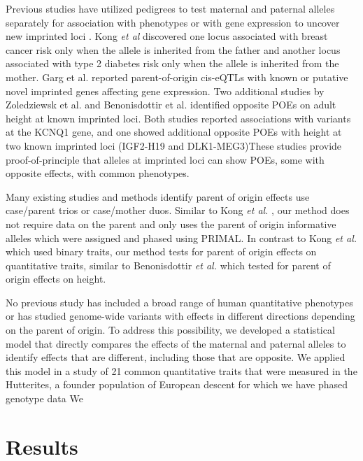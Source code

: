 Previous studies have utilized pedigrees to test maternal and paternal alleles separately for association with phenotypes or with gene expression to uncover new imprinted loci \citep{Kong:2009kk,Baran:2015cx,Garg2012a,Paper2014b,Benonisdottir:2016dz}. Kong \emph{et al} \citep{Kong:2009kk} discovered one locus associated with breast cancer risk only when the allele is inherited from the father and another locus associated with type 2 diabetes risk only when the allele is inherited from the mother. Garg et al. reported parent-of-origin cis-eQTLs with known or putative novel imprinted genes affecting gene expression\citep{Garg2012a}. Two additional studies by Zoledziewsk et al. and Benonisdottir et al. identified opposite POEs on adult height at known imprinted loci\citep{Zoledziewska:2015do,Benonisdottir:2016dz}. Both studies reported associations with variants at the KCNQ1 gene, and one showed additional opposite POEs with height at two known imprinted loci (IGF2-H19 and DLK1-MEG3)\citep{Benonisdottir:2016dz}These studies provide proof-of-principle that alleles at imprinted loci can show POEs, some with opposite effects, with common phenotypes. 

Many existing studies and methods identify parent of origin effects use case/parent trios or case/mother duos\citep{Chuang:2017kp,Howey:2012hj,Ainsworth:2010bp,Weinberg:1999km,Weinberg:1998cf}. Similar to Kong \emph{et al.} \citep{Kong:2009kk}, our method does not require data on the parent and only uses the parent of origin informative alleles which were assigned and phased using PRIMAL\citep{Livne2015}.  In contrast to Kong \emph{et al.} \citep{Kong:2009kk} which used binary traits, our method tests for parent of origin effects on quantitative traits, similar to Benonisdottir \emph{et al.} \citep{Benonisdottir:2016dz} which tested for parent of origin effects on height.

No previous study has included a broad range of human quantitative phenotypes or has studied genome-wide variants with effects in different directions depending on the parent of origin. To address this possibility, we developed a statistical model that directly compares the effects of the maternal and paternal alleles to identify effects that are different, including those that are opposite. We applied this model in a study of 21 common quantitative traits that were measured in the Hutterites, a founder population of European descent for which we have phased genotype data \citep{Livne2015} We 

\section{Results}\label{ch02-results}

